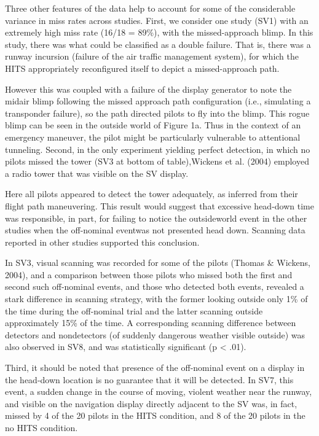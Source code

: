 \documentclass[utf8,bachelor,manualbib]{gradu3}
\begin{document}
Three other features of the data help to account for some of the considerable variance in miss rates across studies. First, we consider one study (SV1) with an extremely high miss rate (16/18 = 89\%), with the missed-approach blimp. In this study, there was what could be classified as a double failure. That is, there was a runway incursion (failure of the air traffic management system), for which the HITS appropriately reconfigured itself to depict a missed-approach path.

However this was coupled with a failure of the display generator to note the midair blimp following the missed approach path configuration (i.e., simulating a transponder failure), so the path directed pilots to fly into the blimp. This rogue blimp can be seen in the outside world of Figure 1a. Thus in the context of an emergency maneuver, the pilot might be particularly vulnerable to attentional tunneling. Second, in the only experiment yielding perfect detection, in which no pilots missed the tower (SV3 at bottom of table),Wickens et al. (2004) employed a radio tower that was visible on the SV display.






Here all pilots appeared to detect the tower adequately, as inferred from their flight path maneuvering. This result would suggest that excessive head-down time was responsible, in part, for failing to notice the outsideworld event in the other studies when the off-nominal eventwas not presented head down. Scanning data reported in other studies supported this conclusion.

In SV3, visual scanning was recorded for some of the pilots (Thomas \& Wickens, 2004), and a comparison between those pilots who missed both the first and second such off-nominal events, and those who detected both events, revealed a stark difference in scanning strategy, with the former looking outside only 1\% of the time during the off-nominal trial and the latter scanning outside approximately 15\% of the time. A corresponding scanning difference between detectors and nondetectors (of suddenly dangerous weather visible outside) was also observed in SV8, and was statistically significant (p < .01).

Third, it should be noted that presence of the off-nominal event on a display in the head-down location is no guarantee that it will be detected. In SV7, this event, a sudden change in the course of moving, violent weather near the runway, and visible
on the navigation display directly adjacent to the SV was, in fact, missed by 4 of the 20 pilots in the HITS condition, and 8 of the 20 pilots in the no HITS condition. 
\end{document}
